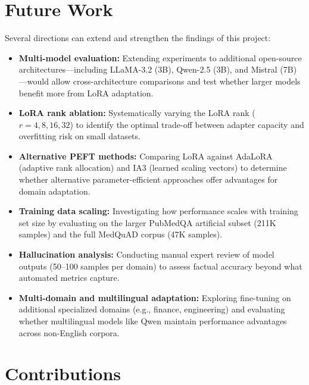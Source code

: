 \documentclass[12pt, letterpaper]{article}
\begin{document}
\section{Future Work}
\label{sec:future-work}

Several directions can extend and strengthen the findings of this project:

\begin{itemize}
    \item \textbf{Multi-model evaluation:} Extending experiments to additional open-source architectures---including LLaMA-3.2 (3B), Qwen-2.5 (3B), and Mistral (7B)---would allow cross-architecture comparisons and test whether larger models benefit more from LoRA adaptation.

    \item \textbf{LoRA rank ablation:} Systematically varying the LoRA rank ($r = 4, 8, 16, 32$) to identify the optimal trade-off between adapter capacity and overfitting risk on small datasets.

    \item \textbf{Alternative PEFT methods:} Comparing LoRA against AdaLoRA \citep{zhang2023adalora} (adaptive rank allocation) and IA3 \citep{liu2022ia3} (learned scaling vectors) to determine whether alternative parameter-efficient approaches offer advantages for domain adaptation.

    \item \textbf{Training data scaling:} Investigating how performance scales with training set size by evaluating on the larger PubMedQA artificial subset (211K samples) and the full MedQuAD corpus (47K samples).

    \item \textbf{Hallucination analysis:} Conducting manual expert review of model outputs (50--100 samples per domain) to assess factual accuracy beyond what automated metrics capture.

    \item \textbf{Multi-domain and multilingual adaptation:} Exploring fine-tuning on additional specialized domains (e.g., finance, engineering) and evaluating whether multilingual models like Qwen maintain performance advantages across non-English corpora.
\end{itemize}

\section{Contributions}
\label{sec:contributions}
\end{document}
